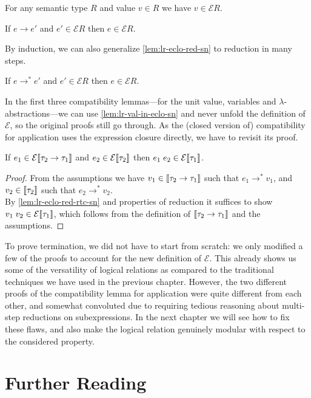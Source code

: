 \begin{lemma}\label{lem:lr-val-in-eclo-sn}
  For any semantic type $R$ and value $v \in R$
  we have $v \in \mathcal{E}R$.
\end{lemma}

\begin{lemma}\label{lem:lr-eclo-red-sn}
  If $e \longrightarrow e'$ and $e' \in \mathcal{E}R$ then $e \in \mathcal{E}R$.
\end{lemma}

By induction, we can also generalize \autoref{lem:lr-eclo-red-sn} to reduction
in many steps.

\begin{lemma}\label{lem:lr-eclo-red-rtc-sn}
  If $e \longrightarrow^* e'$ and $e' \in \mathcal{E}R$ then $e \in \mathcal{E}R$.
\end{lemma}

In the first three compatibility lemmas---for the unit value, variables
and $\lambda$-abstractions---we can use \autoref{lem:lr-val-in-eclo-sn} and
never unfold the definition of $\mathcal{E}$, so the original proofs still go
through.
As the (closed version of) compatibility for application uses the
expression closure directly, we have to revisit its proof.

\begin{lemma}\label{lem:lr-compat-app-cl-sn}
  If $e_1 \in \mathcal{E}\llbracket\tau_2 \to \tau_1\rrbracket$
  and $e_2 \in \mathcal{E}\llbracket\tau_2\rrbracket$
  then $e_1\;e_2 \in \mathcal{E}\llbracket\tau_1\rrbracket$.
\end{lemma}
\begin{proof}
  From the assumptions we have $v_1 \in \llbracket\tau_2 \to \tau_1\rrbracket$ such
  that $e_1 \longrightarrow^* v_1$, and $v_2 \in \llbracket\tau_2\rrbracket$ such
  that $e_2 \longrightarrow^* v_2$. \\
  By \autoref{lem:lr-eclo-red-rtc-sn} and properties of
  reduction it suffices to show $v_1\;v_2 \in \mathcal{E}\llbracket\tau_1\rrbracket$,
  which follows from the definition of $\llbracket\tau_2 \to \tau_1\rrbracket$
  and the assumptions.
\end{proof}

To prove termination, we did not have to start from scratch: we only modified
a few of the proofs to account for the new definition of $\mathcal{E}$.
This already shows us some of the versatility of logical relations as
compared to the traditional techniques we have used in the previous chapter.
However, the two different proofs of the compatibility lemma for application
were quite different from each other, and somewhat convoluted due to requiring
tedious reasoning about multi-step reductions on subexpressions.
In the next chapter we will see how to fix these flaws, and also make the
logical relation genuinely modular with respect to the considered property.

\section{Further Reading}
